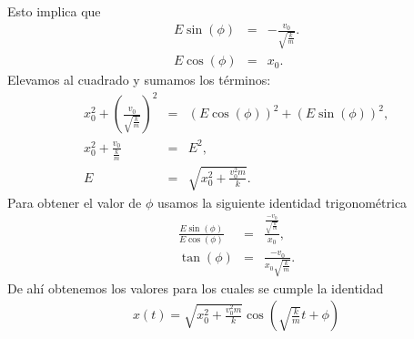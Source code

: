 \documentclass[letterpaper,12pt,oneside]{book}
\begin{document}
Esto implica que
\begin{eqnarray}
E\sin(\phi) &=& -\frac{v_0}{\sqrt{\frac{k}{m}}}.\nonumber\\
E \cos(\phi) &=& x_0.\nonumber
\end{eqnarray}
%
Elevamos al cuadrado y sumamos los t\'erminos:
%
\begin{eqnarray}
x_0^2+\left(\frac{v_0}{\sqrt{\frac{k}{m}}}\right)^2&=&(E\cos(\phi))^2 + (E\sin(\phi))^2,\nonumber\\
x_0^2 + \frac{v_0}{\frac{k}{m}}&=& E^2,\nonumber\\
E&=& \sqrt{x_0^2+\frac{v_0^2m}{k}}.\nonumber
\end{eqnarray}
%
Para obtener el valor de $\phi$ usamos la siguiente identidad trigonom\'etrica
%
\begin{eqnarray}
\frac{E\sin(\phi)}{E\cos(\phi)} &=& \frac{\frac{-v_0}{\sqrt{\frac{k}{m}}}}{x_0},\nonumber\\
\tan(\phi)&=&\frac{-v_0}{x_0\sqrt{\frac{k}{m}}}.\nonumber
\end{eqnarray}
%
De ah\'i obtenemos los valores para los cuales se cumple la identidad
%
\begin{eqnarray}
x(t)= \sqrt{x_0^2+\frac{v_0^2m}{k}}\cos\left(\sqrt{\frac{k}{m}}t + \phi\right) \label{oscilador-f}
\end{eqnarray}
%
\end{document}
